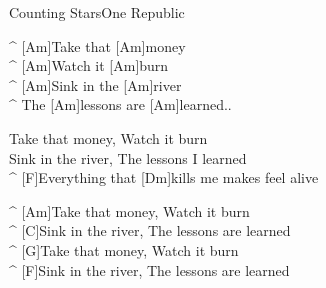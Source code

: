 \begin{song}{Counting Stars}{One Republic}

\begin{guitar}
^ [Am]Take that [Am]money\\
^ [Am]Watch it [Am]burn\\
^ [Am]Sink in the [Am]river\\
^ The [Am]lessons are [Am]learned..\\
\end{guitar}

\begin{guitar}
Take that money, Watch it burn\\
Sink in the river, The lessons I learned\\
^ [F]Everything that [Dm]kills me makes feel alive\\
\end{guitar}


\begin{guitar}
^ [Am]Take that money, Watch it burn\\
^ [C]Sink in the river, The lessons are learned\\
^ [G]Take that money, Watch it burn\\
^ [F]Sink in the river, The lessons are learned\\
\end{guitar}

\end{song}
